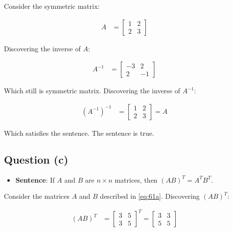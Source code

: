 		Consider the symmetric matrix:

		\begin{align}
			A &= \begin{bmatrix}
					1 & 2 \\[0.3em]
					2 & 3
				\end{bmatrix}&
		\label{eq:61b}
		\end{align}

		Discovering the inverse of $A$:

		\begin{align}
			A^{-1} &=
			\begin{bmatrix}
				-3 & 2 \\[0.3em]
				2 & -1
			\end{bmatrix}&
		\label{eq:61inverse}
		\end{align}

		Which still is symmetric matrix. Discovering the inverse of $A^{-1}$:

		\begin{align}
			(A^{-1})^{-1} &=
			\begin{bmatrix}
				1 & 2 \\[0.3em]
				2 & 3
			\end{bmatrix} = A&
		\end{align}

		Which satisfies the sentence. The sentence is true.

	\subsection{Question (c)}
	
		\begin{itemize}
			\item{\textbf{Sentence}: If $A$ and $B$ are $n \times n$ matrices, then $(AB)^{T} = A^{T}B^{T}$.}
		\end{itemize}

		Consider the matrices $A$ and $B$ described in \cref{eq:61a}. Discovering $(AB)^{T}$:

		\begin{align}
			(AB)^{T} &= \begin{bmatrix}
					3 & 5 \\[0.3em]
					3 & 5
				\end{bmatrix}^{T} = \begin{bmatrix}
					3 & 3 \\[0.3em]
					5 & 5
				\end{bmatrix}&
		\label{eq:61c}
		\end{align}

